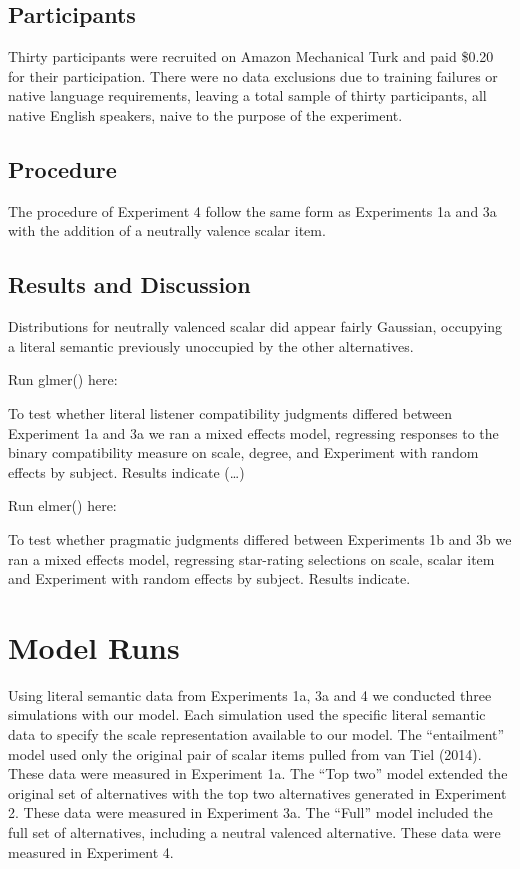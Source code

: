 \documentclass[10pt, letterpaper]{article}
\begin{document}
\subsection{Participants}\label{participants-3}

Thirty participants were recruited on Amazon Mechanical Turk and paid
\$0.20 for their participation. There were no data exclusions due to
training failures or native language requirements, leaving a total
sample of thirty participants, all native English speakers, naive to the
purpose of the experiment.

\subsection{Procedure}\label{procedure-1}

The procedure of Experiment 4 follow the same form as Experiments 1a and
3a with the addition of a neutrally valence scalar item.

\subsection{Results and Discussion}\label{results-and-discussion-3}

Distributions for neutrally valenced scalar did appear fairly Gaussian,
occupying a literal semantic previously unoccupied by the other
alternatives.

Run glmer() here:

To test whether literal listener compatibility judgments differed
between Experiment 1a and 3a we ran a mixed effects model, regressing
responses to the binary compatibility measure on scale, degree, and
Experiment with random effects by subject. Results indicate (\ldots{})

Run elmer() here:

To test whether pragmatic judgments differed between Experiments 1b and
3b we ran a mixed effects model, regressing star-rating selections on
scale, scalar item and Experiment with random effects by subject.
Results indicate.

\section{Model Runs}\label{model-runs}

Using literal semantic data from Experiments 1a, 3a and 4 we conducted
three simulations with our model. Each simulation used the specific
literal semantic data to specify the scale representation available to
our model. The ``entailment'' model used only the original pair of
scalar items pulled from van Tiel (2014). These data were measured in
Experiment 1a. The ``Top two'' model extended the original set of
alternatives with the top two alternatives generated in Experiment 2.
These data were measured in Experiment 3a. The ``Full'' model included
the full set of alternatives, including a neutral valenced alternative.
These data were measured in Experiment 4.
\end{document}
